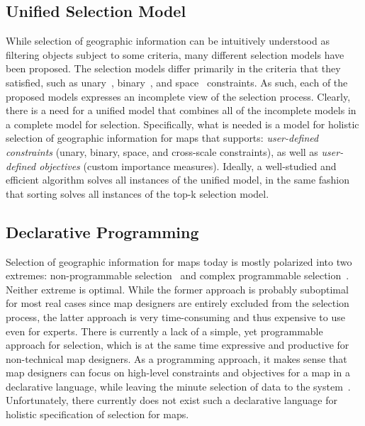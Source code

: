 \documentclass[11pt, oneside]{report}
\begin{document}
{\subsection{Unified Selection Model}
\label{sec:introduction:problem:statement:one}
While selection of geographic information can be intuitively understood as filtering objects subject to some criteria, many different selection models have been proposed. The selection models differ primarily in the criteria that they satisfied, such as unary~\cite{rocha2011efficient}, binary~\cite{nutanong2012multiresolution}, and space~\cite{sarma2012fusiontables} constraints. As such, each of the proposed models expresses an incomplete view of the selection process. Clearly, there is a need for a unified model that combines all of the incomplete models in a complete model for selection. Specifically, what is needed is a model for holistic selection of geographic information for maps that supports: \emph{user-defined constraints} (unary, binary, space, and cross-scale constraints), as well as \emph{user-defined objectives} (custom importance measures). Ideally, a well-studied and efficient algorithm solves all instances of the unified model, in the same fashion that sorting solves all instances of the top-k selection model.

\subsection{Declarative Programming}
\label{sec:introduction:problem:statement:two}
Selection of geographic information for maps today is mostly polarized into two extremes: non-programmable selection~\cite{sarma2012fusiontables} and complex programmable selection~\cite{lamy1999application}. Neither extreme is optimal. While the former approach is probably suboptimal for most real cases since map designers are entirely excluded from the selection process, the latter approach is  very time-consuming and thus expensive to use even for experts. There is currently a lack of a simple, yet programmable approach for selection, which is at the same time expressive and productive for non-technical map designers. As a programming approach, it makes sense that map designers can focus on high-level constraints and objectives for a map in a declarative language, while leaving the minute selection of data to the system~\cite{meliou2011reverse}. Unfortunately, there currently does not exist such a declarative language for holistic specification of selection for maps.

}
\end{document}
